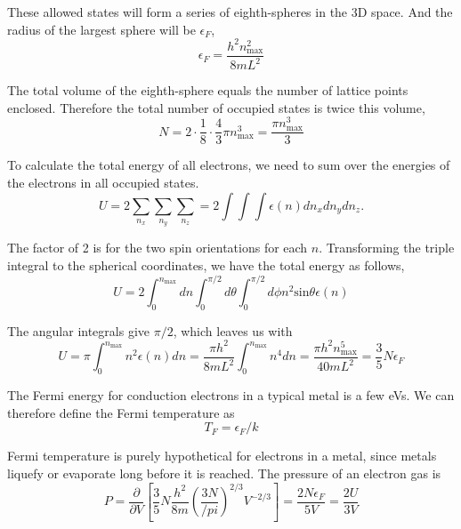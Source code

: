 These allowed states will form a series of eighth-spheres in the 3D space. And the radius of the largest sphere will be $\epsilon_F$,
\begin{equation}
\epsilon_F = \frac{h^2n_\textrm{max}^2}{8mL^2}
\end{equation}

The total volume of the eighth-sphere equals the number of lattice points enclosed. Therefore the total number of occupied states is
twice this volume,
\begin{equation}
N = 2 \cdot \frac{1}{8} \cdot \frac{4}{3} \pi n_\textrm{max}^3 = \frac{\pi n_\textrm{max}^3}{3}
\end{equation}

To calculate the total energy of all electrons, we need to sum over the energies of the electrons in all occupied states.
\begin{equation}
U = 2 \sum_{n_x} \sum_{n_y} \sum_{n_z} = 2 \int\int\int \epsilon(n) dn_x dn_y dn_z.
\end{equation}

The factor of 2 is for the two spin orientations for each $n$. 
Transforming the triple integral to the spherical coordinates, we have the total energy as follows,
\begin{equation}
U = 2 \int_0^{n_\textrm{max}} dn \int_0 ^{\pi/2} d\theta \int_0 ^{\pi/2} d\phi n^2 \textrm{sin}\theta \epsilon(n)
\end{equation}

The angular integrals give $\pi/2$, which leaves us with
\begin{equation}
U = \pi \int_0^{n_\textrm{max}} n^2 \epsilon(n) dn 
  = \frac{\pi h^2}{8mL^2} \int _0 ^{n_\textrm{max}} n^4 dn
  = \frac{\pi h^2 n^5_\textrm{max}}{40mL^2} 
  = \frac{3}{5} N \epsilon_F
\end{equation}

The Fermi energy for conduction electrons in a typical metal is a few eVs.
We can therefore define the Fermi temperature as
\begin{equation}
T_F = \epsilon_F/k
\end{equation}

Fermi temperature is purely hypothetical for electrons in a metal, since metals liquefy or evaporate long before it is reached.
The pressure of an electron gas is
\begin{equation}
P = \frac{\partial}{\partial V} [\frac{3}{5}N \frac{h^2}{8m} (\frac{3N}{/pi})^{2/3} V^{-2/3}] 
  = \frac{2N\epsilon_F}{5V} = \frac{2U}{3V}
\end{equation}

